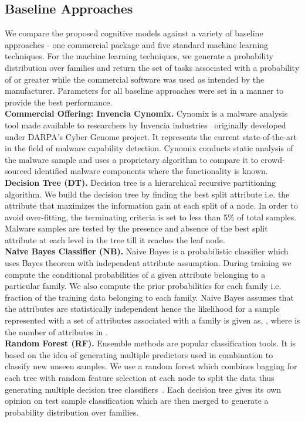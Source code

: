 \documentclass[conference]{IEEEtran}
\begin{document}
\subsection{Baseline Approaches}
\label{baselineAppr}
We compare the proposed cognitive models against a variety of baseline approaches - one commercial package and five standard machine learning techniques.  For the machine learning techniques, we generate a probability distribution over families and return the set of tasks associated with a probability of  or greater while the commercial software was used as intended by the manufacturer.  Parameters for all baseline approaches were set in a manner to provide the best performance.\smallskip\\
\noindent\textbf{Commercial Offering: Invencia Cynomix.}  Cynomix is a malware analysis tool made available to researchers by Invencia industries~\cite{invencia} originally developed under DARPA's Cyber Genome project.  It represents the current state-of-the-art in the field of malware capability detection.  Cynomix conducts static analysis of the malware sample and uses a proprietary algorithm to compare it to crowd-sourced identified malware components where the functionality is known.\smallskip\\
\noindent\textbf{Decision Tree (DT).}  Decision tree is a hierarchical recursive partitioning algorithm. We build the decision tree by finding the best split attribute i.e. the attribute that maximizes the information gain at each split of a node. In order to avoid over-fitting, the terminating criteria is set to less than 5\% of total samples. Malware samples are tested by the presence and absence of the best split attribute at each level in the tree till it reaches the leaf node.\smallskip\\
\noindent\textbf{Naive Bayes Classifier (NB).}  Naive Bayes is a probabilistic classifier which uses Bayes theorem with independent attribute assumption. During training we compute the conditional probabilities of a given attribute belonging to a particular family. We also compute the prior probabilities for each family i.e. fraction of the training data belonging to each family. Naive Bayes assumes that the attributes are statistically independent hence the likelihood for a sample  represented with a set of attributes  associated with a family  is given as, , where  is the number of attributes in .\smallskip\\
\noindent\textbf{Random Forest (RF).}  Ensemble methods are popular classification tools. It is based on the idea of generating multiple predictors used in combination to classify new unseen samples. We use a random forest which combines bagging for each tree with random feature selection at each node to split the data thus generating multiple decision tree classifiers~\cite{Breiman01}. Each decision tree gives its own opinion on test sample classification which are then merged to generate a probability distribution over families.\smallskip\\
\end{document}
